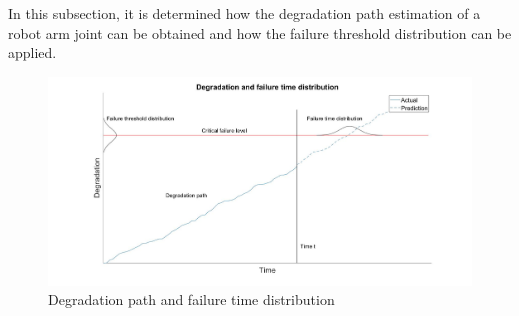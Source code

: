 In this subsection, it is determined how the degradation path estimation of a robot arm joint can be obtained and how the failure threshold distribution can be applied.

\begin{figure}[ht]
\centering
\includegraphics[width=\textwidth]{Figures/DegradationDistribution}
\caption[Degradation path and failure time distribution]{Degradation path and failure time distribution} \label{fig:DegradationDistribution}
\end{figure}

